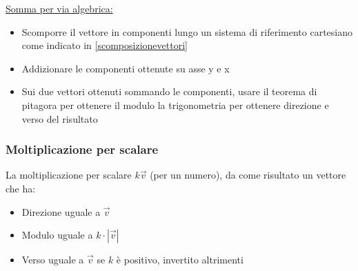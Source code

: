 \underline{Somma per via algebrica:}
\begin{itemize}
	\item Scomporre il vettore in componenti lungo un sistema di riferimento cartesiano come indicato in \cref{scomposizionevettori}
	\item Addizionare le componenti ottenute su asse y e x
	\item Sui due vettori ottenuti sommando le componenti, usare il teorema di pitagora per ottenere il modulo la trigonometria per ottenere direzione e verso del risultato
\end{itemize}
\subsubsection{Moltiplicazione per scalare}
La moltiplicazione per scalare $ k \vec{v} $ (per un numero), da come risultato un vettore che ha:
\begin{itemize}
	\item Direzione uguale a $ \vec{v} $
	\item Modulo uguale a $ k \cdot \left|\vec{v}\right| $
	\item Verso uguale a $ \vec{v} $ se $ k $ è positivo, invertito altrimenti
\end{itemize}

\vskip3mm
\vskip3mm
